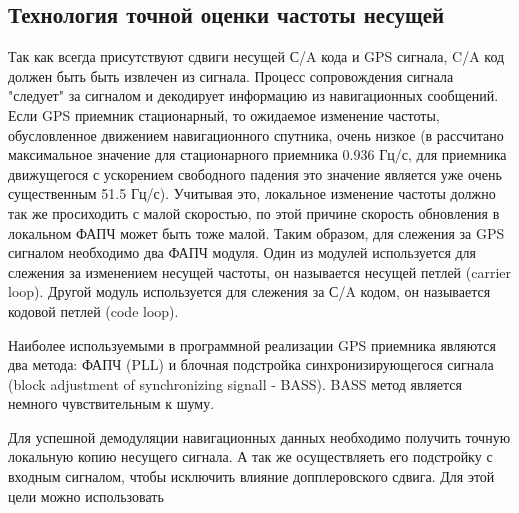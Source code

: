\subsection{Технология точной оценки частоты несущей}
Так как всегда присутствуют сдвиги несущей С/A кода и GPS сигнала, C/A код должен быть быть извлечен из сигнала. Процесс сопровождения 
сигнала "следует" за сигналом и декодирует информацию из навигационных сообщений. Если GPS приемник стационарный, то ожидаемое
изменение частоты, обусловленное движением навигационного спутника, очень низкое (в \cite{tsui} рассчитано максимальное 
значение для стационарного
приемника 0.936 Гц/с, для приемника движущегося с ускорением свободного падения это значение является уже очень существенным 
51.5 Гц/с).
Учитывая это, локальное изменение частоты должно так же просиходить с малой скоростью, по этой причине скорость обновления в
локальном ФАПЧ может быть тоже малой. Таким образом, для слежения за GPS сигналом необходимо два ФАПЧ модуля. Один из модулей
используется для слежения за изменением несущей частоты, он называется несущей петлей (carrier loop). Другой модуль 
используется для слежения за С/A кодом, он называется кодовой петлей (code loop).

Наиболее используемыми в программной реализации GPS приемника являются два метода: ФАПЧ (PLL) и блочная подстройка синхронизирующегося
сигнала (block adjustment of synchronizing signall - BASS). BASS метод является немного чувствительным к шуму.

Для успешной демодуляции навигационных данных необходимо получить точную локальную копию несущего сигнала. А
так же осуществляеть его подстройку с входным сигналом, чтобы исключить влияние допплеровского сдвига. Для этой 
цели можно использовать


